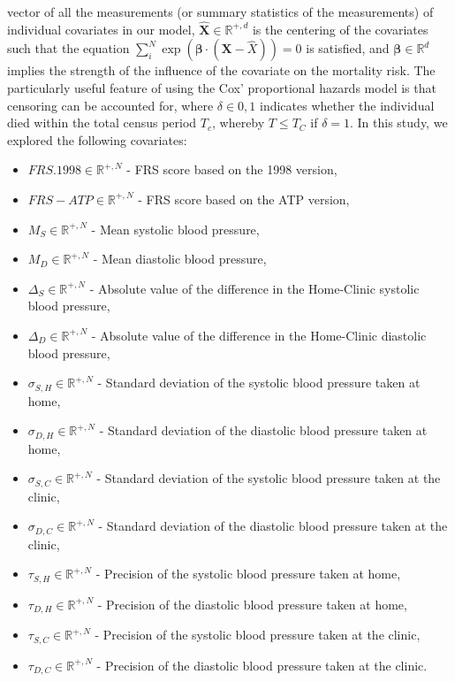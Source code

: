 \documentclass[
]{article}
\providecommand{\tightlist}{%
  \setlength{\itemsep}{0pt}\setlength{\parskip}{0pt}}
\begin{document}
vector of all the measurements (or summary statistics of the
measurements) of individual covariates in our model,
\(\hat{\boldsymbol{X}}\in\mathbb{R}^{+,d}\) is the centering of the
covariates such that the equation
\(\sum_i^N \exp{(\boldsymbol{\beta}\cdot(\boldsymbol{X}-\hat{X}))}=0\)
is satisfied, and \(\boldsymbol{\beta}\in\mathbb{R}^d\) implies the
strength of the influence of the covariate on the mortality risk. The
particularly useful feature of using the Cox' proportional hazards model
is that censoring can be accounted for, where \(\delta\in{0,1}\)
indicates whether the individual died within the total census period
\(T_c\), whereby \(T\leq T_C\) if \(\delta=1\). In this study, we
explored the following covariates:

\begin{itemize}
\tightlist
\item
  \(FRS.1998\in\mathbb{R}^{+,N}\) - FRS score based on the 1998 version,
\item
  \(FRS-ATP\in\mathbb{R}^{+,N}\) - FRS score based on the ATP version,
\item
  \(M_S\in\mathbb{R}^{+,N}\) - Mean systolic blood pressure,
\item
  \(M_D\in\mathbb{R}^{+,N}\) - Mean diastolic blood pressure,
\item
  \(\Delta_S\in\mathbb{R}^{+,N}\) - Absolute value of the difference in
  the Home-Clinic systolic blood pressure,
\item
  \(\Delta_D\in\mathbb{R}^{+,N}\) - Absolute value of the difference in
  the Home-Clinic diastolic blood pressure,
\item
  \(\sigma_{S,H}\in\mathbb{R}^{+,N}\) - Standard deviation of the
  systolic blood pressure taken at home,
\item
  \(\sigma_{D,H}\in\mathbb{R}^{+,N}\) - Standard deviation of the
  diastolic blood pressure taken at home,
\item
  \(\sigma_{S,C}\in\mathbb{R}^{+,N}\) - Standard deviation of the
  systolic blood pressure taken at the clinic,
\item
  \(\sigma_{D,C}\in\mathbb{R}^{+,N}\) - Standard deviation of the
  diastolic blood pressure taken at the clinic,
\item
  \(\tau_{S,H}\in\mathbb{R}^{+,N}\) - Precision of the systolic blood
  pressure taken at home,
\item
  \(\tau_{D,H}\in\mathbb{R}^{+,N}\) - Precision of the diastolic blood
  pressure taken at home,
\item
  \(\tau_{S,C}\in\mathbb{R}^{+,N}\) - Precision of the systolic blood
  pressure taken at the clinic,
\item
  \(\tau_{D,C}\in\mathbb{R}^{+,N}\) - Precision of the diastolic blood
  pressure taken at the clinic.
\end{itemize}
\end{document}

